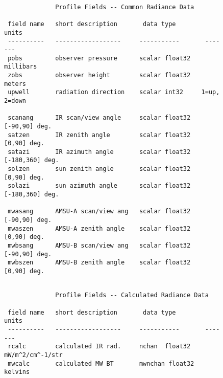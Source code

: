\documentclass[12pt]{article}
\begin{document}
\begin{figure}
{\small
\begin{verbatim}

              Profile Fields -- Common Radiance Data
  
 field name   short description       data type         units
 ----------   ------------------     -----------       -------
 pobs         observer pressure      scalar float32   millibars
 zobs         observer height        scalar float32   meters
 upwell       radiation direction    scalar int32     1=up, 2=down

 scanang      IR scan/view angle     scalar float32   [-90,90] deg.
 satzen       IR zenith angle        scalar float32   [0,90] deg.
 satazi       IR azimuth angle       scalar float32   [-180,360] deg.
 solzen       sun zenith angle       scalar float32   [0,90] deg.
 solazi       sun azimuth angle      scalar float32   [-180,360] deg.

 mwasang      AMSU-A scan/view ang   scalar float32   [-90,90] deg.
 mwaszen      AMSU-A zenith angle    scalar float32   [0,90] deg.
 mwbsang      AMSU-B scan/view ang   scalar float32   [-90,90] deg.
 mwbszen      AMSU-B zenith angle    scalar float32   [0,90] deg.

\end{verbatim}
}
\end{figure}
\begin{figure}
{\small
\begin{verbatim}

              Profile Fields -- Calculated Radiance Data
  
 field name   short description       data type         units
 ----------   ------------------     -----------       -------
 rcalc        calculated IR rad.     nchan  float32   mW/m^2/cm^-1/str
 mwcalc       calculated MW BT       mwnchan float32  kelvins

\end{verbatim}
}
\end{figure}
\end{document}
